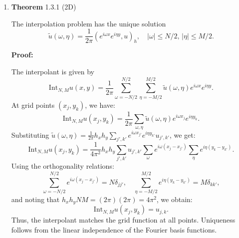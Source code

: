 \documentclass[12pt]{article}
\begin{document}

    \begin{enumerate}
        \item   \textbf{Theorem} 1.3.1 (2D)
        
                The interpolation problem has the unique solution
                \begin{equation*}
                    \tilde{u}(\omega, \eta) = \frac{1}{2\pi} (e^{i\omega x} e^{i\eta y}, u)_h, \quad |\omega| \leq N/2, \, |\eta| \leq M/2.
                \end{equation*}

                \textbf{Proof:}

                The interpolant is given by
                \begin{equation*}
                    \text{Int}_{N,M} u(x,y) = \frac{1}{2\pi} \sum_{\omega=-N/2}^{N/2} \sum_{\eta=-M/2}^{M/2} \tilde{u}(\omega, \eta) e^{i\omega x} e^{i\eta y}.
                \end{equation*}
                At grid points $(x_j, y_k)$, we have:
                \begin{equation*}
                    \text{Int}_{N,M} u(x_j, y_k) = \frac{1}{2\pi} \sum_{\omega,\eta} \tilde{u}(\omega, \eta) e^{i\omega x_j} e^{i\eta y_k}.
                \end{equation*}
                Substituting $\tilde{u}(\omega, \eta) = \frac{1}{2\pi} h_x h_y \sum_{j',k'} e^{i\omega x_{j'}} e^{i\eta y_{k'}} u_{j',k'}$, we get:
                \begin{equation*}
                    \text{Int}_{N,M} u(x_j, y_k) = \frac{1}{4\pi^2} h_x h_y \sum_{j',k'} u_{j',k'} \sum_{\omega} e^{i\omega (x_j - x_{j'})} \sum_{\eta} e^{i\eta (y_k - y_{k'})}.
                \end{equation*}
                Using the orthogonality relations:
                \begin{equation*}
                    \sum_{\omega=-N/2}^{N/2} e^{i\omega (x_j - x_{j'})} = N \delta_{jj'}, \quad \sum_{\eta=-M/2}^{M/2} e^{i\eta (y_k - y_{k'})} = M \delta_{kk'},
                \end{equation*}
                and noting that $h_x h_y N M = (2\pi)(2\pi) = 4\pi^2$, we obtain:
                \begin{equation*}
                    \text{Int}_{N,M} u(x_j, y_k) = u_{j,k}.
                \end{equation*}
                Thus, the interpolant matches the grid function at all points. Uniqueness follows from the linear independence of the Fourier basis functions.
                \newpage


\end{enumerate}
\end{document}
